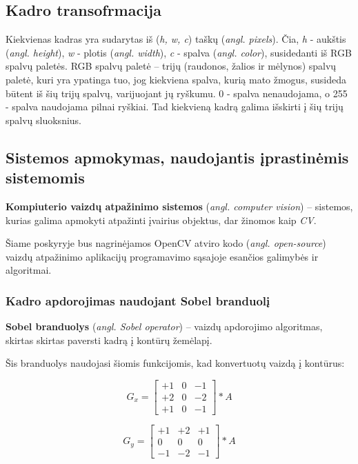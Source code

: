 \documentclass{VUMIFInfKursinis}
\begin{document}
\subsection{Kadro transofrmacija}
Kiekvienas kadras yra sudarytas iš (\textit{h, w, c}) taškų (\textit{angl. pixels}). Čia, \textit{h} - aukštis (\textit{angl. height}), \textit{w} - plotis (\textit{angl. width}), \textit{c} - spalva (\textit{angl. color}), susidedanti iš RGB spalvų paletės. RGB spalvų paletė – trijų (raudonos, žalios ir mėlynos) spalvų paletė, kuri yra ypatinga tuo, jog kiekviena spalva, kurią mato žmogus, susideda būtent iš šių trijų spalvų, varijuojant jų ryškumu. 0 - spalva nenaudojama, o 255 - spalva naudojama pilnai ryškiai. Tad kiekvieną kadrą galima išskirti į šių trijų spalvų sluoksnius.

\subsection{Sistemos apmokymas, naudojantis įprastinėmis sistemomis}
\textbf{Kompiuterio vaizdų atpažinimo sistemos} (\textit{angl. computer vision}) – sistemos, kurias galima apmokyti atpažinti įvairius objektus, dar žinomos kaip \textit{CV}.

Šiame poskyryje bus nagrinėjamos OpenCV atviro kodo (\textit{angl. open-source}) vaizdų atpažinimo aplikacijų programavimo sąsajoje esančios galimybės ir algoritmai.

\subsubsection{Kadro apdorojimas naudojant Sobel branduolį}
\textbf{Sobel branduolys} (\textit{angl. Sobel operator}) – vaizdų apdorojimo algoritmas, skirtas skirtas paversti kadrą į kontūrų žemėlapį.

Šis branduolys naudojasi šiomis funkcijomis, kad konvertuotų vaizdą į kontūrus:

\begin{equation}\label{eq:sobelgx}
	G_x = 
	\begin{bmatrix}
	+1 & 0 & -1 \\
	+2 & 0 & -2 \\
	+1 & 0 & -1
	\end{bmatrix} * A
\end{equation}
	
\begin{equation}\label{eq:sobelgy}
	G_y = 
	\begin{bmatrix}
	+1 & +2 & +1 \\
	0 & 0 & 0 \\
	-1 & -2 & -1
	\end{bmatrix} * A
\end{equation}
\end{document}
